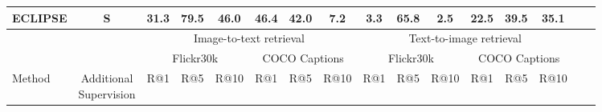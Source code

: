 \begin{table*}[t]
\begin{tabular}{lccccccccccccccc}
        \textbf{ECLIPSE} & S & \textbf{31.3} & \textbf{79.5} & \textbf{46.0} & \textbf{46.4} & 42.0 & \textbf{7.2} & \textbf{3.3} & 65.8 & \textbf{2.5} & \textbf{22.5} & \textbf{39.5} & \textbf{35.1} \\
        \bottomrule
        \toprule
            & & \multicolumn{6}{c}{Image-to-text retrieval} & \multicolumn{6}{c}{Text-to-image retrieval} \\
            & & \multicolumn{3}{c}{Flickr30k} & \multicolumn{3}{c}{COCO Captions} & \multicolumn{3}{c}{Flickr30k} & \multicolumn{3}{c}{COCO Captions} \\
            Method & \shortstack{Additional\\Supervision} & R@1 & R@5 & R@10 & R@1 & R@5 & R@10 & R@1 & R@5 & R@10 & R@1 & R@5 & R@10 \\

\end{tabular}
\end{table*}
